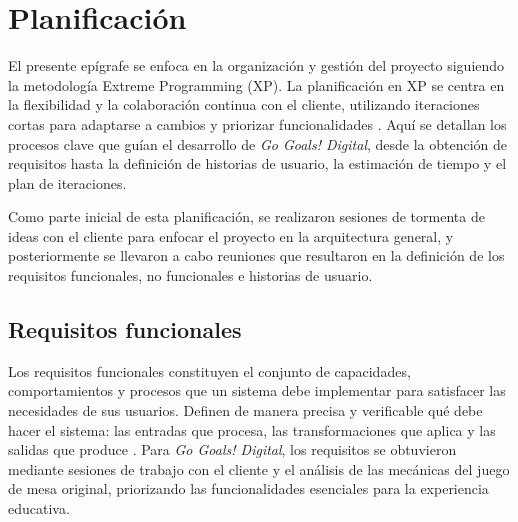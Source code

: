 \section{Planificación}
\label{sec:planificacion}

El presente epígrafe se enfoca en la organización y gestión del proyecto siguiendo la metodología Extreme Programming (XP). La planificación en XP se centra en la flexibilidad y la colaboración continua con el cliente, utilizando iteraciones cortas para adaptarse a cambios y priorizar funcionalidades \parencite{Beck2004}. Aquí se detallan los procesos clave que guían el desarrollo de \textit{Go Goals! Digital}, desde la obtención de requisitos hasta la definición de historias de usuario, la estimación de tiempo y el plan de iteraciones.

Como parte inicial de esta planificación, se realizaron sesiones de tormenta de ideas con el cliente para enfocar el proyecto en la arquitectura general, y posteriormente se llevaron a cabo reuniones que resultaron en la definición de los requisitos funcionales, no funcionales e historias de usuario.

\subsection{Requisitos funcionales}
\label{subsec:req_funcionales}

Los requisitos funcionales constituyen el conjunto de capacidades, comportamientos y procesos que un sistema debe implementar para satisfacer las necesidades de sus usuarios. Definen de manera precisa y verificable qué debe hacer el sistema: las entradas que procesa, las transformaciones que aplica y las salidas que produce \parencite{Sommerville2021, Pressman2019}. Para \textit{Go Goals! Digital}, los requisitos se obtuvieron mediante sesiones de trabajo con el cliente y el análisis de las mecánicas del juego de mesa original, priorizando las funcionalidades esenciales para la experiencia educativa.


